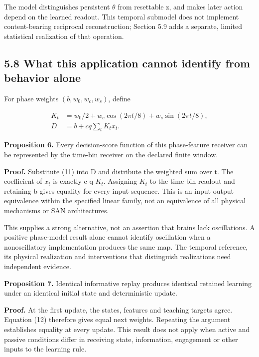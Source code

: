 \documentclass[
  american,
  11pt,
  letterpaper,
]{article}
\begin{document}
The model distinguishes persistent \(\theta\) from resettable z, and makes later action depend on the learned readout. This temporal submodel does not implement content-bearing reciprocal reconstruction; Section 5.9 adds a separate, limited statistical realization of that operation.

\subsection{5.8 What this application cannot identify from behavior alone}\label{what-this-application-cannot-identify-from-behavior-alone}

For phase weights \((b,w_0,w_c,w_s)\), define

\begin{equation}
\begin{aligned}K_t&=w_0/2+w_c\cos(2\pi t/8)+w_s\sin(2\pi t/8),\\ D&=b+cq\sum_tK_tx_t.\end{aligned}\tag{13}
\end{equation}

\textbf{Proposition 6.} Every decision-score function of this phase-feature receiver can be represented by the time-bin receiver on the declared finite window.

\textbf{Proof.} Substitute (11) into D and distribute the weighted sum over t. The coefficient of \(x_t\) is exactly c q \(K_t\). Assigning \(K_t\) to the time-bin readout and retaining b gives equality for every input sequence. This is an input-output equivalence within the specified linear family, not an equivalence of all physical mechanisms or SAN architectures.

This supplies a strong alternative, not an assertion that brains lack oscillations. A positive phase-model result alone cannot identify oscillation when a nonoscillatory implementation produces the same map. The temporal reference, its physical realization and interventions that distinguish realizations need independent evidence.

\textbf{Proposition 7.} Identical informative replay produces identical retained learning under an identical initial state and deterministic update.

\textbf{Proof.} At the first update, the states, features and teaching targets agree. Equation (12) therefore gives equal next weights. Repeating the argument establishes equality at every update. This result does not apply when active and passive conditions differ in receiving state, information, engagement or other inputs to the learning rule.
\end{document}
